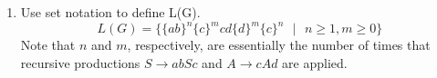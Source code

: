 \documentclass[12pt]{article}
\begin{document}
\begin{enumerate}
\begin{enumerate}
          \begin{center}
        \end{center}
        \item Use set notation to define L(G).
          \[ L(G) = \Big\{ \{ab\}^{n}\{c\}^{m}cd\{d\}^{m}\{c\}^{n} \textrm{ $\vert$ } n \ge 1, m \ge 0 \Big\} \]
          Note that $n$ and $m$, respectively, are essentially the number of times that recursive productions $S \rightarrow abSc$ and $A \rightarrow cAd$ are applied.
      \end{enumerate}
    \end {enumerate}
\end{document}
